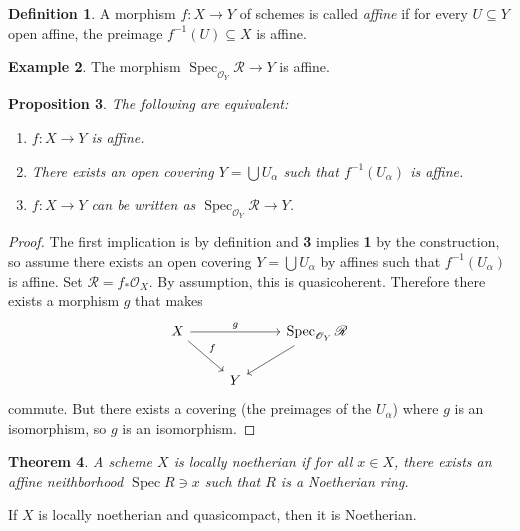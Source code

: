 \documentclass[leqno, openany]{memoir}
\newtheorem{thm}{Theorem}[section]
\newtheorem{prop}[thm]{Proposition}
\theoremstyle{definition}
\newtheorem{defn}[thm]{Definition}
\newtheorem{exm}[thm]{Example}
\theoremstyle{remark}
\theoremstyle{plain}
\theoremstyle{definition}
\theoremstyle{remark}
\newcommand{\msc}[1]{\mathscr{#1}}
\DeclareMathOperator{\Spec}{Spec}
\begin{document}
\begin{defn}
    A morphism $f \colon X \to Y$ of schemes is called \textit{affine} if for every $U \subseteq Y$ open affine, the preimage $f^{-1}(U) \subseteq X$ is affine. 
\end{defn}

\begin{exm}
    The morphism $\Spec_{\msc{O}_Y} \msc{R} \to Y$ is affine.
\end{exm}

\begin{prop}
    The following are equivalent:
    \begin{enumerate}
        \item $f \colon X \to Y$ is affine.
        \item There exists an open covering $Y = \bigcup U_{\alpha}$ such that $f^{-1}(U_{\alpha})$ is affine.
        \item $f \colon X \to Y$ can be written as $\Spec_{\msc{O}_Y} \msc{R} \to Y$.
    \end{enumerate}
\end{prop}

\begin{proof}
    The first implication is by definition and \textbf{3} implies \textbf{1} by the construction, so assume there exists an open covering $Y = \bigcup U_{\alpha}$ by affines such that $f^{-1}(U_{\alpha})$ is affine. Set $\msc{R} = f_* \msc{O}_X$. By assumption, this is quasicoherent. Therefore there exists a morphism $g$ that makes
    \begin{equation*}
    \begin{tikzcd}
        X \arrow{rr}{g} \arrow{dr}{f} & & \Spec_{\msc{O}_Y} \msc{R} \arrow{dl} \\
                                      & Y
    \end{tikzcd}
    \end{equation*}
    commute. But there exists a covering (the preimages of the $U_{\alpha}$) where $g$ is an isomorphism, so $g$ is an isomorphism.
\end{proof}

\begin{thm}
    A scheme $X$ is \textit{locally noetherian} if for all $x \in X$, there exists an affine neithborhood $\Spec R \ni x$ such that $R$ is a Noetherian ring. 
\end{thm}

If $X$ is locally noetherian and quasicompact, then it is Noetherian.
\end{document}
